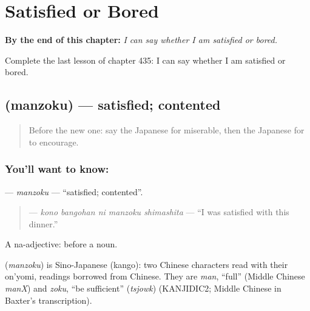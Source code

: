 
\chapter{Satisfied or Bored}
\label{ch:ja-satisfied-or-bored}

\begin{chapteropening}
\textbf{By the end of this chapter:} \emph{I can say whether I am satisfied or bored.}

Complete the last lesson of chapter 435: I can say whether I am satisfied or bored.
\end{chapteropening}

\section[\texorpdfstring{\ja{まんぞく} (manzoku)}{まんぞく (manzoku)}]{ (manzoku) — satisfied; contented}

\label{lesson:JA-C435-manzoku}



\begin{quote}
Before the new one: say the Japanese for miserable, then the Japanese for to encourage.
\end{quote}

\subsection*{You'll want to know: }
\textbf{} — \emph{manzoku} — \textquotedblleft{}satisfied; contented\textquotedblright{}.

\begin{quote}
\textbf{  } — \emph{kono bangohan ni manzoku shimashita} — \textquotedblleft{}I was satisfied with this dinner.\textquotedblright{}
\end{quote}

A na-adjective:  before a noun.

\begin{cousinweb}
\textbf{} (\emph{manzoku}) is Sino-Japanese (kango): two Chinese characters read with their on'yomi, readings borrowed from Chinese. They are \emph{man}, \textquotedblleft{}full\textquotedblright{} (Middle Chinese \emph{manX}) and \emph{zoku}, \textquotedblleft{}be sufficient\textquotedblright{} (\emph{tsjowk}) (KANJIDIC2; Middle Chinese in Baxter's transcription).
\end{cousinweb}

